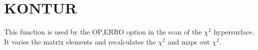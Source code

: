 \section{KONTUR}
\label{sect:kontur}

\noindent This function is used by the OP,ERRO option in the scan of the
$\chi^2$ hypersurface.\\

\noindent It varies the matrix elements and recalculates the $\chi^2$ and
maps out $\chi^2$.\\
